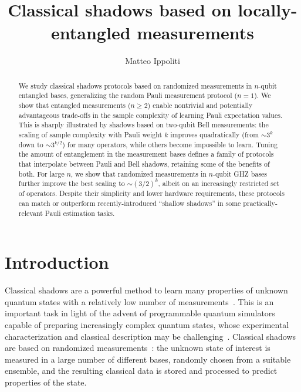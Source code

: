 \documentclass[a4paper,twocolumns,11pt,accepted=2024-03-04]{quantumarticle}
\begin{document}
\title{Classical shadows based on locally-entangled measurements}

\author{Matteo Ippoliti}

\begin{abstract}
We study classical shadows protocols based on randomized measurements in $n$-qubit entangled bases, generalizing the random Pauli measurement protocol ($n = 1$). 
We show that entangled measurements ($n\geq 2$) enable nontrivial and potentially advantageous trade-offs in the sample complexity of learning Pauli expectation values.
This is sharply illustrated by shadows based on two-qubit Bell measurements: the scaling of sample complexity with Pauli weight $k$  improves quadratically (from $\sim 3^k$ down to $\sim 3^{k/2}$) for many operators, while others become impossible to learn.
Tuning the amount of entanglement in the measurement bases defines a family of protocols that interpolate between Pauli and Bell shadows, retaining some of the benefits of both.
For large $n$, we show that randomized measurements in $n$-qubit GHZ bases further improve the best scaling to $\sim (3/2)^k$, albeit on an increasingly restricted set of operators.
Despite their simplicity and lower hardware requirements, these protocols can match or outperform recently-introduced ``shallow shadows'' in some practically-relevant Pauli estimation tasks.
\end{abstract}

\maketitle

\section{Introduction}

Classical shadows are a powerful method to learn many properties of unknown quantum states with a relatively low number of measurements~\cite{huang_predicting_2020,elben_randomized_2023,hadfield_measurements_2020,chen_robust_2021,acharya_shadow_2021,struchalin_experimental_2021,levy_classical_2021,kunjummen_shadow_2023,huang_learning_2022-1,wan_matchgate_2022,bu_classical_2022,nguyen_optimizing_2022,koh_classical_2022,grier_sample-optimal_2022,becker_classical_2022,seif_shadow_2023,van_kirk_hardware-efficient_2022}. 
This is an important task in light of the advent of programmable quantum simulators capable of preparing increasingly complex quantum states, whose experimental characterization and classical description may be challenging~\cite{arute_quantum_2019,altman_quantum_2021,ebadi_quantum_2021,mi_information_2021}. 
Classical shadows are based on randomized measurements~\cite{brydges_probing_2019,elben_statistical_2019,elben_randomized_2023}: the unknown state of interest is measured in a large number of different bases, randomly chosen from a suitable ensemble, and the resulting classical data is stored and processed to predict properties of the state. 
\end{document}
